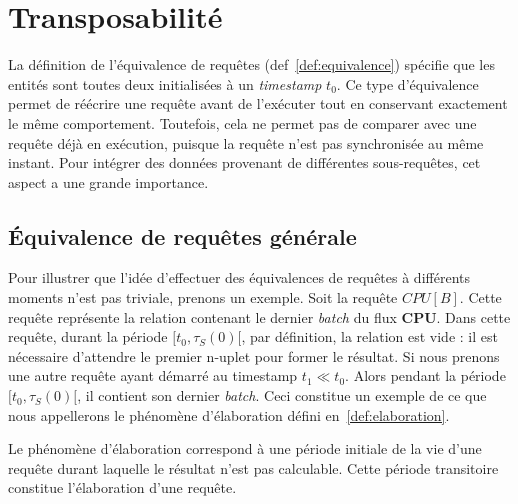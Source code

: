\section{Transposabilité}\label{sec:contrib:astral:transposabilite}
La définition de l'équivalence de requêtes (def~\ref{def:equivalence}) spécifie que les entités sont toutes deux initialisées à un \textit{timestamp} $t_0$. Ce type d'équivalence permet de réécrire une requête avant de l'exécuter tout en conservant exactement le même comportement. Toutefois, cela ne permet pas de comparer avec une requête déjà en exécution, puisque la requête n'est pas synchronisée au même instant. Pour intégrer des données provenant de différentes sous-requêtes, cet aspect a une grande importance.

\subsection{Équivalence de requêtes générale}
Pour illustrer que l'idée d'effectuer des équivalences de requêtes à différents moments n'est pas triviale, prenons un exemple. Soit la requête $CPU[B]$. Cette requête représente la relation contenant le dernier \textit{batch} du flux \textbf{CPU}. Dans cette requête, durant la période $[t_0,\tau_S(0)[$, par définition, la relation est vide : il est nécessaire d'attendre le premier n-uplet pour former le résultat. Si nous prenons une autre requête ayant démarré au timestamp $t_1 \ll t_0$. Alors pendant la période $[t_0,\tau_S(0)[$, il contient son dernier \textit{batch}. Ceci constitue un exemple de ce que nous appellerons le phénomène d'élaboration défini en~\ref{def:elaboration}.
\begin{defi}\label{def:elaboration}
    Le phénomène d'élaboration correspond à une période initiale de la vie d'une requête durant laquelle le résultat n'est pas calculable. Cette période transitoire constitue l'élaboration d'une requête.
\end{defi}

